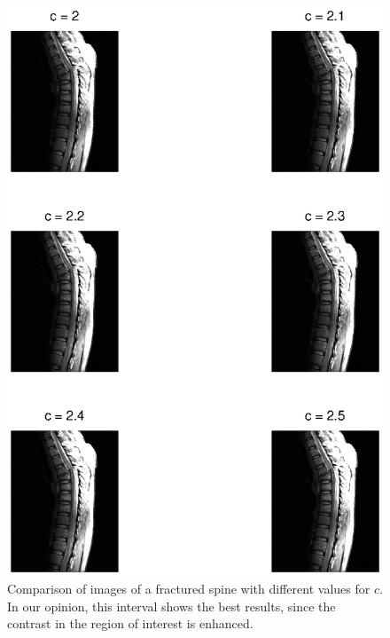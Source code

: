 \begin{figure}[!Htb]
  \centering
  \includegraphics[width=\textwidth]{fracturedSpinesBest.eps}
  \caption{Comparison of images of a fractured spine with different values for \(c\). In our opinion, this interval shows the best results, since the contrast in the region of interest is enhanced.}
  \label{fig:fractured_spines_best}
\end{figure}

\clearpage